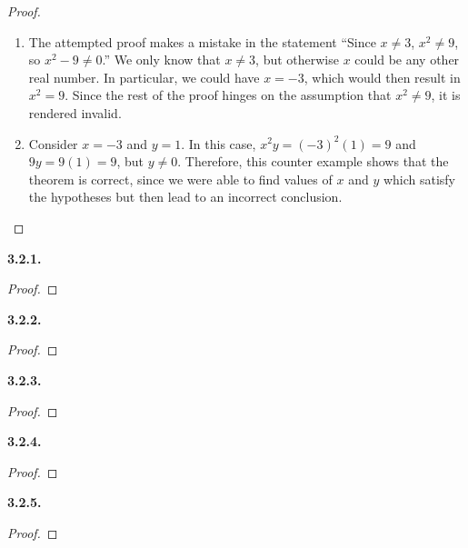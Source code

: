\documentclass[12pt]{amsart}
\newenvironment{statement}[1]{\smallskip\noindent\color[rgb]{.6627, .3529, .6314} {\bf #1.}}{}
\theoremstyle{definition}
\theoremstyle{remark}
\begin{document}
\begin{proof}
\hfill
\begin{enumerate}
	\item The attempted proof makes a mistake in the statement
	``Since $x \neq 3$, $x^2 \neq 9$, so $x^2 - 9 \neq 0$.''
	We only know that $x \neq 3$, but otherwise $x$ could be any other real number.
	In particular, we could have $x = -3$, which would then result in $x^2 = 9$.
	Since the rest of the proof hinges on the assumption that $x^2 \neq 9$, it is rendered invalid.
	
	\item Consider $x = -3$ and $y = 1$.
	In this case, $x^2y = (-3)^2(1) = 9$ and $9y = 9(1) = 9$, but $y \neq 0$.
	Therefore, this counter example shows that the theorem is correct,
	since we were able to find values of $x$ and $y$ which satisfy the hypotheses but
	then lead to an incorrect conclusion.
\end{enumerate}
\end{proof}


\begin{statement}{3.2.1}
\end{statement}

\begin{proof}
\end{proof}


\begin{statement}{3.2.2}
\end{statement}

\begin{proof}
\end{proof}


\begin{statement}{3.2.3}
\end{statement}

\begin{proof}
\end{proof}


\begin{statement}{3.2.4}
\end{statement}

\begin{proof}
\end{proof}


\begin{statement}{3.2.5}
\end{statement}

\begin{proof}
\end{proof}
\end{document}
